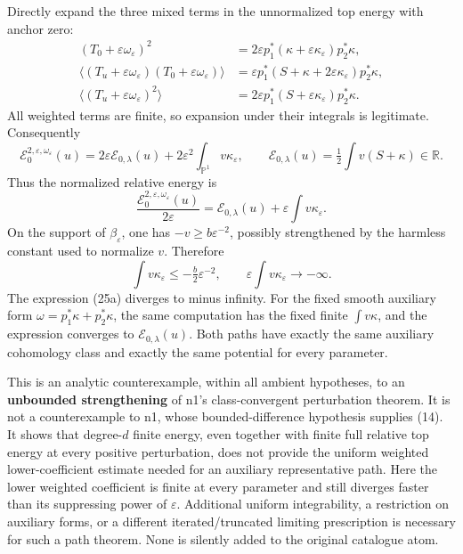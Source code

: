 \documentclass[
  11pt,
]{article}
\begin{document}
Directly expand the three mixed terms in the unnormalized top energy
with anchor zero: \[
\begin{aligned}
(T_0+\varepsilon\omega_\varepsilon)^2
 &=2\varepsilon p_1^*(\kappa+\varepsilon\kappa_\varepsilon)p_2^*\kappa,\\
\langle(T_u+\varepsilon\omega_\varepsilon)(T_0+\varepsilon\omega_\varepsilon)\rangle
 &=\varepsilon p_1^*(S+\kappa+2\varepsilon\kappa_\varepsilon)p_2^*\kappa,\\
\langle(T_u+\varepsilon\omega_\varepsilon)^2\rangle
 &=2\varepsilon p_1^*(S+\varepsilon\kappa_\varepsilon)p_2^*\kappa.
\end{aligned}
\] All weighted terms are finite, so expansion under their integrals is
legitimate. Consequently \[
\mathcal E^{2,\varepsilon,\omega_\varepsilon}_0(u)
=2\varepsilon\mathcal E_{0,\lambda}(u)
 +2\varepsilon^2\int_{\mathbb P^1}v\kappa_\varepsilon,
\qquad
\mathcal E_{0,\lambda}(u)=\tfrac12\int v(S+\kappa)\in\mathbb R.
\tag{24a}
\] Thus the normalized relative energy is \[
\frac{\mathcal E^{2,\varepsilon,\omega_\varepsilon}_0(u)}{2\varepsilon}
=\mathcal E_{0,\lambda}(u)+\varepsilon\int v\kappa_\varepsilon.
\tag{25a}
\] On the support of \(\beta_\varepsilon\), one has
\(-v\geq b\varepsilon^{-2}\), possibly strengthened by the harmless
constant used to normalize \(v\). Therefore \[
\int v\kappa_\varepsilon\leq-\tfrac b2\varepsilon^{-2},
\qquad
\varepsilon\int v\kappa_\varepsilon\longrightarrow-\infty.
\] The expression (25a) diverges to minus infinity. For the fixed smooth
auxiliary form \(\omega=p_1^*\kappa+p_2^*\kappa\), the same computation
has the fixed finite \(\int v\kappa\), and the expression converges to
\(\mathcal E_{0,\lambda}(u)\). Both paths have exactly the same
auxiliary cohomology class and exactly the same potential for every
parameter.

This is an analytic counterexample, within all ambient hypotheses, to an
\textbf{unbounded strengthening} of n1's class-convergent perturbation
theorem. It is not a counterexample to n1, whose bounded-difference
hypothesis supplies (14). It shows that degree-\(d\) finite energy, even
together with finite full relative top energy at every positive
perturbation, does not provide the uniform weighted lower-coefficient
estimate needed for an auxiliary representative path. Here the lower
weighted coefficient is finite at every parameter and still diverges
faster than its suppressing power of \(\varepsilon\). Additional uniform
integrability, a restriction on auxiliary forms, or a different
iterated/truncated limiting prescription is necessary for such a path
theorem. None is silently added to the original catalogue atom.
\end{document}
